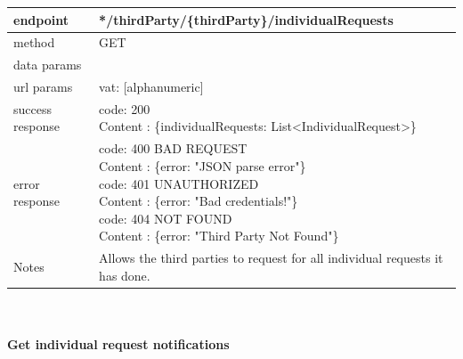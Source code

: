 \begin{legal}
\begin{legal}
\begin{itemize}
								\begin{tabularx}{\linewidth}{| l| l }
									\hline
									endpoint & */thirdParty/\{thirdParty\}/individualRequests \\
									\hline
									method & GET \\
									\hline
									data params & \\
									\hline
									url params &
									\parbox{0.7\textwidth}{
										\bigskip
										vat: [alphanumeric]
										\bigskip
									} \\
									\hline
									success response &
									\parbox{0.7\textwidth}{
										\bigskip
										code: 200\\
										Content : \{individualRequests: List<IndividualRequest>\}
										\bigskip
									} \\
									\hline
									error response &
									\parbox{0.7\textwidth}{
										\bigskip
										code: 400 BAD REQUEST \\
										Content : \{error: "JSON parse error"\}\\
										code: 401 UNAUTHORIZED \\
										Content : \{error: "Bad credentials!"\}\\
										code: 404 NOT FOUND \\
										Content : \{error: "Third Party Not Found"\}
										\bigskip
									} \\
									\hline
									Notes & 
									\parbox{0.7\textwidth}{
										\bigskip Allows the third parties to request for all individual requests it has done.
									\bigskip}  \\
									\hline
								\end{tabularx}\\\\
								
								\textbf{Get individual request notifications} \\
			

\end{itemize}
\end{legal}
\end{legal}
